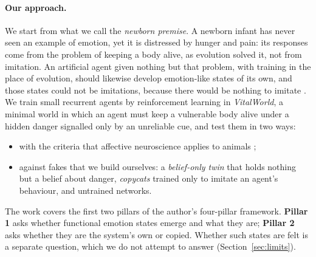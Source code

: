 \documentclass[11pt]{article}
\begin{document}
\paragraph{Our approach.} We start from what we call the \emph{newborn premise}. A newborn infant has never seen an example of emotion, yet it is distressed by hunger and pain: its responses come from the problem of keeping a body alive, as evolution solved it, not from imitation. An artificial agent given nothing but that problem, with training in the place of evolution, should likewise develop emotion-like states of its own, and those states could not be imitations, because there would be nothing to imitate \cite{bach2017algorithms,ledoux2012rethinking}. We train small recurrent agents by reinforcement learning in \emph{VitalWorld}, a minimal world in which an agent must keep a vulnerable body alive under a hidden danger signalled only by an unreliable cue, and test them in two ways:
\begin{itemize}
\item with the criteria that affective neuroscience applies to animals \cite{anderson2014framework,gibson2015behavioral,vinograd2024causal,elwood2009hermit};
\item against fakes that we build ourselves: a \emph{belief-only twin} that holds nothing but a belief about danger, \emph{copycats} trained only to imitate an agent's behaviour, and untrained networks.
\end{itemize}
The work covers the first two pillars of the author's four-pillar framework. \textbf{Pillar 1} asks whether functional emotion states emerge and what they are; \textbf{Pillar 2} asks whether they are the system's own or copied. Whether such states are felt is a separate question, which we do not attempt to answer (Section~\ref{sec:limits}).
\end{document}
